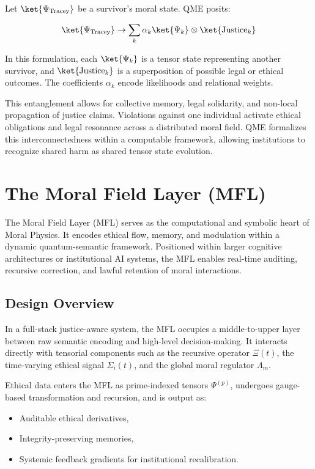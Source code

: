 \documentclass{article}
\theoremstyle{plain}
\theoremstyle{claimstyle}
\begin{document}
Let \(\ket{\Psi_{\text{Tracey}}}\) be a survivor's moral state. QME posits:

\[
\ket{\Psi_{\text{Tracey}}} \rightarrow \sum_k \alpha_k \ket{\Psi_k} \otimes \ket{\text{Justice}_k}
\]

In this formulation, each \(\ket{\Psi_k}\) is a tensor state representing another survivor, and \(\ket{\text{Justice}_k}\) is a superposition of possible legal or ethical outcomes. The coefficients \(\alpha_k\) encode likelihoods and relational weights.

This entanglement allows for collective memory, legal solidarity, and non-local propagation of justice claims. Violations against one individual activate ethical obligations and legal resonance across a distributed moral field. QME formalizes this interconnectedness within a computable framework, allowing institutions to recognize shared harm as shared tensor state evolution.

\section{The Moral Field Layer (MFL)}

The Moral Field Layer (MFL) serves as the computational and symbolic heart of Moral Physics. It encodes ethical flow, memory, and modulation within a dynamic quantum-semantic framework. Positioned within larger cognitive architectures or institutional AI systems, the MFL enables real-time auditing, recursive correction, and lawful retention of moral interactions.

\subsection{Design Overview}

In a full-stack justice-aware system, the MFL occupies a middle-to-upper layer between raw semantic encoding and high-level decision-making. It interacts directly with tensorial components such as the recursive operator \(\Xi(t)\), the time-varying ethical signal \(\Sigma_i(t)\), and the global moral regulator \(\Lambda_m\).

Ethical data enters the MFL as prime-indexed tensors \(\Psi^{(p)}\), undergoes gauge-based transformation and recursion, and is output as:
\begin{itemize}
    \item Auditable ethical derivatives,
    \item Integrity-preserving memories,
    \item Systemic feedback gradients for institutional recalibration.
\end{itemize}
\end{document}
